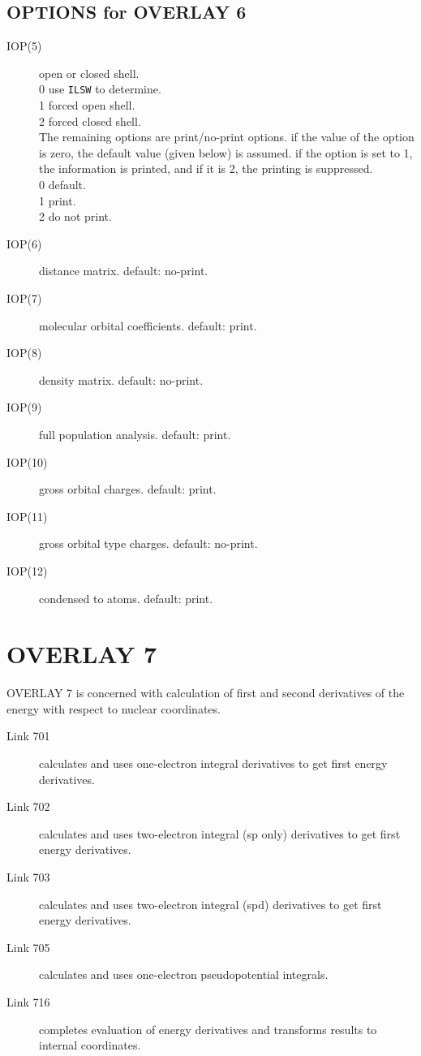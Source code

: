 \subsection{\sf OPTIONS for OVERLAY 6}
\begin{description}
\item[IOP(5)]  open or closed shell.  \\
0  use {\tt ILSW} to determine. \\
1  forced open shell. \\
2  forced closed shell. \\
The remaining options are print/no-print options. if the
value of the option is zero, the default value (given below) is
assumed. if the option is set to 1, the information is printed,
and if it is 2, the printing is suppressed.  \\
0  default. \\
1  print. \\
2  do not print. \\
\item[IOP(6)]  distance matrix. default: no-print.
\item[IOP(7)]  molecular orbital coefficients. default: print.
\item[IOP(8)]  density matrix. default: no-print.
\item[IOP(9)]  full population analysis. default: print.
\item[IOP(10)]  gross orbital charges. default: print.
\item[IOP(11)]  gross orbital type charges. default: no-print.
\item[IOP(12)]  condensed to atoms. default: print.
\end{description}
\section{\sf OVERLAY 7}
OVERLAY 7 is concerned with calculation of first and second
derivatives of the energy with respect to nuclear coordinates.
\begin{description}
\item[Link 701] calculates and uses one-electron integral derivatives
to get first energy derivatives.
\item[Link 702] calculates and uses two-electron integral (sp only)
derivatives to get first energy derivatives.
\item[Link 703] calculates and uses two-electron integral (spd)
derivatives to get first energy derivatives.
\item[Link 705] calculates and uses one-electron pseudopotential
integrals.
\item[Link 716] completes evaluation of energy derivatives and
transforms results to internal coordinates.
\end{description}
